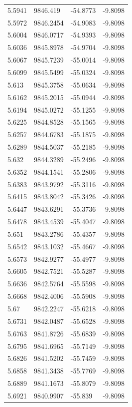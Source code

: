 \begin{table}[H]
\begin{tabular}{llll}
5.5941 & 9846.419 & -54.8773 & -9.8098 \\
5.5972 & 9846.2454 & -54.9083 & -9.8098 \\
5.6004 & 9846.0717 & -54.9393 & -9.8098 \\
5.6036 & 9845.8978 & -54.9704 & -9.8098 \\
5.6067 & 9845.7239 & -55.0014 & -9.8098 \\
5.6099 & 9845.5499 & -55.0324 & -9.8098 \\
5.613 & 9845.3758 & -55.0634 & -9.8098 \\
5.6162 & 9845.2015 & -55.0944 & -9.8098 \\
5.6194 & 9845.0272 & -55.1255 & -9.8098 \\
5.6225 & 9844.8528 & -55.1565 & -9.8098 \\
5.6257 & 9844.6783 & -55.1875 & -9.8098 \\
5.6289 & 9844.5037 & -55.2185 & -9.8098 \\
5.632 & 9844.3289 & -55.2496 & -9.8098 \\
5.6352 & 9844.1541 & -55.2806 & -9.8098 \\
5.6383 & 9843.9792 & -55.3116 & -9.8098 \\
5.6415 & 9843.8042 & -55.3426 & -9.8098 \\
5.6447 & 9843.6291 & -55.3736 & -9.8098 \\
5.6478 & 9843.4539 & -55.4047 & -9.8098 \\
5.651 & 9843.2786 & -55.4357 & -9.8098 \\
5.6542 & 9843.1032 & -55.4667 & -9.8098 \\
5.6573 & 9842.9277 & -55.4977 & -9.8098 \\
5.6605 & 9842.7521 & -55.5287 & -9.8098 \\
5.6636 & 9842.5764 & -55.5598 & -9.8098 \\
5.6668 & 9842.4006 & -55.5908 & -9.8098 \\
5.67 & 9842.2247 & -55.6218 & -9.8098 \\
5.6731 & 9842.0487 & -55.6528 & -9.8098 \\
5.6763 & 9841.8726 & -55.6839 & -9.8098 \\
5.6795 & 9841.6965 & -55.7149 & -9.8098 \\
5.6826 & 9841.5202 & -55.7459 & -9.8098 \\
5.6858 & 9841.3438 & -55.7769 & -9.8098 \\
5.6889 & 9841.1673 & -55.8079 & -9.8098 \\
5.6921 & 9840.9907 & -55.839 & -9.8098 \\

\end{tabular}
\end{table}
